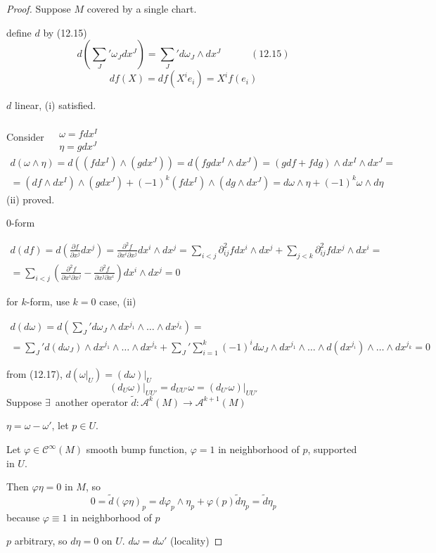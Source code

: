 \documentclass[11pt]{amsart}
\theoremstyle{definition}
\begin{document}
\begin{proof}
  Suppose $M$ covered by a single chart.

define $d$ by (12.15)
\[
d\left( \sum_J' \omega_J dx^J \right) = \sum_J' d\omega_J \wedge dx^J \quad \quad \quad (12.15)
\]
\[
df(X) = df(X^i e_i ) = X^i f(e_i)
\]

$d$ linear, (i) satisfied.

Consider $\begin{aligned} & \quad \\ & \omega = fdx^I \\ & \eta = gdx^J \end{aligned}$
\[
\begin{gathered}
  d(\omega \wedge \eta) = d((fdx^I ) \wedge (g dx^J)) = d(fg dx^I \wedge dx^J) = (gdf + fdg) \wedge dx^I \wedge dx^J = \\
   = (df \wedge dx^I) \wedge (gdx^J) + (-1)^k( fdx^I ) \wedge (dg \wedge dx^J) = d\omega \wedge \eta + (-1)^k \omega \wedge d\eta
\end{gathered}
\]
(ii) proved.

0-form

\[
\begin{gathered}
  d(df) = d \left( \frac{ \partial f}{ \partial x^j} dx^j \right) = \frac{ \partial^2 f}{ \partial x^i \partial x^j} dx^i \wedge dx^j = \sum_{ i < j } \partial^2_{ij} f dx^i \wedge dx^j + \sum_{j < k } \partial^2_{ij} f dx^j \wedge dx^i = \\
   = \sum_{i < j } \left( \frac{ \partial^2 f}{ \partial x^i \partial x^j} - \frac{ \partial^2 f}{ \partial x^j \partial x^i } \right) dx^i \wedge dx^j = 0
\end{gathered}
\]

for $k$-form, use $k=0$ case, (ii)

\[
\begin{gathered}
  d(d\omega) = d\left( \sum_J' d\omega_J \wedge dx^{j_1} \wedge \dots \wedge dx^{j_k} \right) = \\
  = \sum_J' d(d \omega_J) \wedge dx^{j_1} \wedge \dots \wedge dx^{j_k} + \sum_J' \sum_{i=1}^k (-1)^i d\omega_J \wedge dx^{j_1} \wedge \dots \wedge d(dx^{j_i}) \wedge \dots \wedge dx^{j_k} = 0
\end{gathered}
\]

from (12.17), $d( \left. \omega \right|_U ) = \left. (d\omega ) \right|_U$
\[
\left. (d_U \omega) \right|_{UU'} = d_{UU'} \omega = \left. (d_{U'} \omega) \right|_{UU'}
\]
Suppose $\exists \, $ another operator $\widetilde{d} : \mathcal{A}^k(M) \to \mathcal{A}^{k+1}(M)$

$\eta = \omega - \omega'$, let $p\in U$.

Let $\varphi \in \mathcal{C}^{\infty}(M)$ smooth bump function, $\varphi =1$ in neighborhood of $p$, supported in $U$.

Then $\varphi \eta =0 $ in $M$, so
\[
 0 = \widetilde{d}(\varphi \eta)_p = d\varphi_p \wedge \eta_p  + \varphi(p) \widetilde{d}\eta_p = \widetilde{d}\eta_p
\]
because $\varphi \equiv 1$ in neighborhood of $p$

$p$ arbitrary, so $d\eta = 0$ on $U$.  $d\omega = d\omega'$ (locality)

\end{proof}
\end{document}
